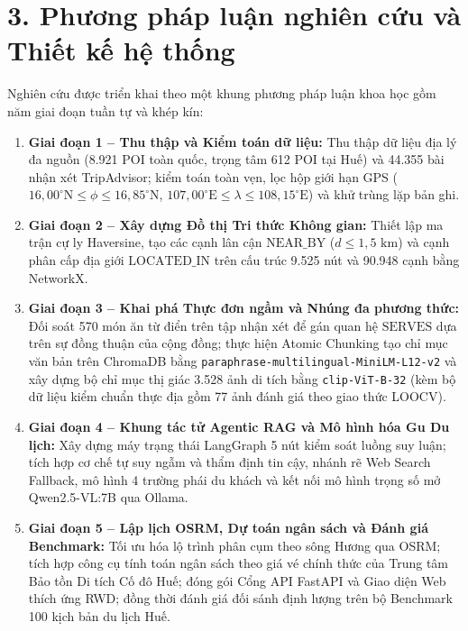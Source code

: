 \section*{3. Phương pháp luận nghiên cứu và Thiết kế hệ thống}
{}

Nghiên cứu được triển khai theo một khung phương pháp luận khoa học gồm năm giai đoạn tuần tự và khép kín:
\begin{enumerate}
    \item \textbf{Giai đoạn 1 -- Thu thập và Kiểm toán dữ liệu:} Thu thập dữ liệu địa lý đa nguồn (8.921 POI toàn quốc, trọng tâm 612 POI tại Huế) và 44.355 bài nhận xét TripAdvisor; kiểm toán toàn vẹn, lọc hộp giới hạn GPS ($16{,}00^\circ\text{N} \le \phi \le 16{,}85^\circ\text{N}$, $107{,}00^\circ\text{E} \le \lambda \le 108{,}15^\circ\text{E}$) và khử trùng lặp bản ghi.
    \item \textbf{Giai đoạn 2 -- Xây dựng Đồ thị Tri thức Không gian:} Thiết lập ma trận cự ly Haversine, tạo các cạnh lân cận $\text{NEAR\_BY}$ ($d \le 1{,}5\text{ km}$) và cạnh phân cấp địa giới $\text{LOCATED\_IN}$ trên cấu trúc 9.525 nút và 90.948 cạnh bằng NetworkX.
    \item \textbf{Giai đoạn 3 -- Khai phá Thực đơn ngầm và Nhúng đa phương thức:} Đối soát 570 món ăn từ điển trên tập nhận xét để gán quan hệ $\text{SERVES}$ dựa trên sự đồng thuận của cộng đồng; thực hiện Atomic Chunking tạo chỉ mục văn bản trên ChromaDB bằng \texttt{paraphrase-multilingual-MiniLM-L12-v2} và xây dựng bộ chỉ mục thị giác 3.528 ảnh di tích bằng \texttt{clip-ViT-B-32} (kèm bộ dữ liệu kiểm chuẩn thực địa gồm 77 ảnh đánh giá theo giao thức LOOCV).
    \item \textbf{Giai đoạn 4 -- Khung tác tử Agentic RAG và Mô hình hóa Gu Du lịch:} Xây dựng máy trạng thái LangGraph 5 nút kiểm soát luồng suy luận; tích hợp cơ chế tự suy ngẫm và thẩm định tin cậy, nhánh rẽ Web Search Fallback, mô hình 4 trường phái du khách và kết nối mô hình trọng số mở Qwen2.5-VL:7B qua Ollama.
    \item \textbf{Giai đoạn 5 -- Lập lịch OSRM, Dự toán ngân sách và Đánh giá Benchmark:} Tối ưu hóa lộ trình phân cụm theo sông Hương qua OSRM; tích hợp công cụ tính toán ngân sách theo giá vé chính thức của Trung tâm Bảo tồn Di tích Cố đô Huế; đóng gói Cổng API FastAPI và Giao diện Web thích ứng RWD; đồng thời đánh giá đối sánh định lượng trên bộ Benchmark 100 kịch bản du lịch Huế.
\end{enumerate}
